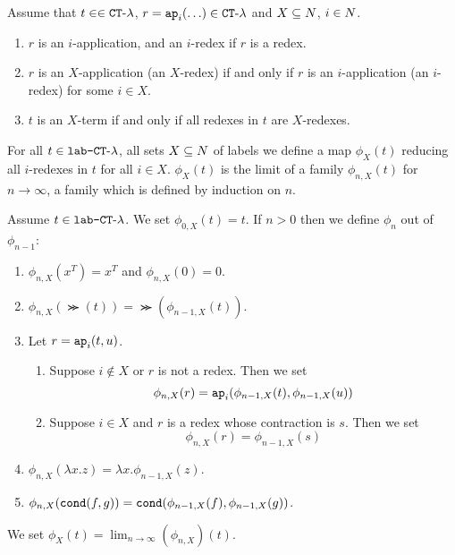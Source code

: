 \begin{definition}
\label{definition-X-term}
Assume that $t \in \in { {\tt CT}\mbox{-}\lambda}$, $r = {\tt ap}_i(\ldots) \in { {\tt CT}\mbox{-}\lambda}$ 
and $X \subseteq {N}$, $i \in {N}$.
\begin{enumerate}
\item
$r$ is an $i$-application, and an $i$-redex if $r$ is a redex.
\item
$r$ is an $X$-application (an $X$-redex) 
if and only if $r$ is an $i$-application (an $i$-redex) for some $i \in X$. 
\item
$t$ is an $X$-term if and only if all redexes in $t$ are $X$-redexes.
\end{enumerate}
\end{definition}


For all $t \in {\mbox{\tt lab-} { {\tt CT}\mbox{-}\lambda} }$, all sets $X \subseteq {N}$ of labels
we define a map  $\phi_X(t)$ reducing all $i$-redexes in $t$ for all $i \in X$. 
$\phi_X(t)$ is the limit of a family $\phi_{n,X}(t)$ for $n \rightarrow \infty$, 
a family which is defined by induction on $n$.





\begin{definition}
Assume $t \in {\mbox{\tt lab-} { {\tt CT}\mbox{-}\lambda} }$.
We set $\phi_{0,X}(t)=t$. If $n >0$ then we define $\phi_n$ out of $\phi_{n-1}$:
\begin{enumerate} 

\item
$\phi_{n,X}(x^T)=x^T$ and $\phi_{n,X}(0)=0$.

\item
$\phi_{n,X}(\Succ(t)) = \Succ(\phi_{n-1,X}(t))$. 

\item
Let $r = {\tt ap}_i(t,u)$. 
\begin{enumerate} 
\item
Suppose $i \not \in X$ or $r$ is not a redex. Then we set
$$\phi_{n,X}(r) = {\tt ap}_i(\phi_{n-1,X}(t),\phi_{n-1,X}(u))$$
\item
Suppose $i \in X$ and $r$ is a redex whose contraction is $s$. Then we set
$$\phi_{n,X}(r) = \phi_{n-1,X}(s)$$
\end{enumerate}

\item
$\phi_{n,X}(\lambda x.z) = \lambda x.\phi_{n-1,X}(z)$.

\item
$\phi_{n,X}({\tt cond}(f,g)) = {\tt cond}(\phi_{n-1,X}(f), \phi_{n-1,X}(g))$.

\end{enumerate}

We set $\phi_X(t) = \lim_{n \rightarrow \infty}(\phi_{n,X})(t)$.
\end{definition}



